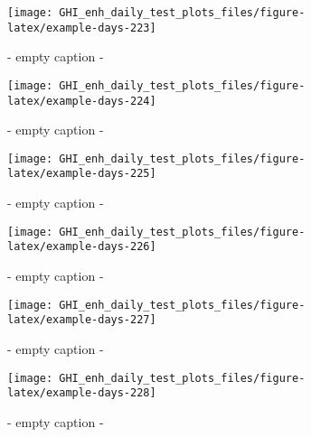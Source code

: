 \documentclass[
  10pt,
  a4paper,oneside]{article}
\begin{document}
\begin{figure}[H]

{\centering \texttt{[image: GHI\_enh\_daily\_test\_plots\_files/figure-latex/example-days-223]} 

}

\caption{ - empty caption - }\label{fig:example-days-223}
\end{figure}

\begin{figure}[H]

{\centering \texttt{[image: GHI\_enh\_daily\_test\_plots\_files/figure-latex/example-days-224]} 

}

\caption{ - empty caption - }\label{fig:example-days-224}
\end{figure}

\begin{figure}[H]

{\centering \texttt{[image: GHI\_enh\_daily\_test\_plots\_files/figure-latex/example-days-225]} 

}

\caption{ - empty caption - }\label{fig:example-days-225}
\end{figure}

\begin{figure}[H]

{\centering \texttt{[image: GHI\_enh\_daily\_test\_plots\_files/figure-latex/example-days-226]} 

}

\caption{ - empty caption - }\label{fig:example-days-226}
\end{figure}

\begin{figure}[H]

{\centering \texttt{[image: GHI\_enh\_daily\_test\_plots\_files/figure-latex/example-days-227]} 

}

\caption{ - empty caption - }\label{fig:example-days-227}
\end{figure}

\begin{figure}[H]

{\centering \texttt{[image: GHI\_enh\_daily\_test\_plots\_files/figure-latex/example-days-228]} 

}

\caption{ - empty caption - }\label{fig:example-days-228}
\end{figure}
\end{document}
